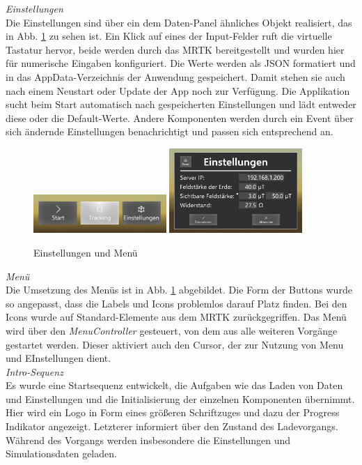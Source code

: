 \textit{Einstellungen}\\
Die Einstellungen sind über ein dem Daten-Panel ähnliches Objekt realisiert, das in Abb. \ref{img:menu-and-settings} zu sehen ist. Ein Klick auf eines der Input-Felder ruft die virtuelle Tastatur hervor, beide werden durch das MRTK bereitgestellt und wurden hier für numerische Eingaben konfiguriert. Die Werte werden als JSON formatiert und in das AppData-Verzeichnis der Anwendung gespeichert. Damit stehen sie auch nach einem Neustart oder Update der App noch zur Verfügung. Die Applikation sucht beim Start automatisch nach gespeicherten Einstellungen und lädt entweder diese oder die Default-Werte. Andere Komponenten werden durch ein Event über sich ändernde Einstellungen benachrichtigt und passen sich entsprechend an.\\

\begin{figure}[H]
	\centering
	\includegraphics[width=0.45\textwidth]{images/menu.jpg}
	\hspace{0.05cm}	
	\includegraphics[width=0.45\textwidth]{images/settings.jpg}
	\caption{Einstellungen und Menü}
	\label{img:menu-and-settings}
\end{figure}

\textit{Menü}\\
Die Umsetzung des Menüs ist in Abb. \ref{img:menu-and-settings} abgebildet. Die Form der Buttons wurde so angepasst, dass die Labels und Icons problemlos darauf Platz finden. Bei den Icons wurde auf Standard-Elemente aus dem MRTK zurückgegriffen. Das Menü wird über den \textit{MenuController} gesteuert, von dem aus alle weiteren Vorgänge gestartet werden. Dieser aktiviert auch den Cursor, der zur Nutzung von Menu und EInstellungen dient.\\

\textit{Intro-Sequenz}\\
Es wurde eine Startsequenz entwickelt, die Aufgaben wie das Laden von Daten und Einstellungen und die Initialisierung der einzelnen Komponenten übernimmt. Hier wird ein Logo in Form eines größeren Schriftzuges und dazu der Progress Indikator angezeigt. Letzterer informiert über den Zustand des Ladevorgangs. Während des Vorgangs werden insbesondere die Einstellungen und  Simulationsdaten geladen.\\

